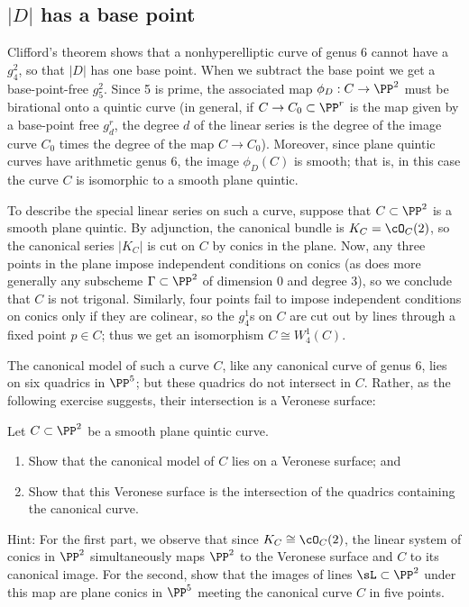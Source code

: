 \subsection{$|D|$ has a base point}\label{g26 has a base point}
Clifford's theorem shows that a nonhyperelliptic curve of genus 6 cannot have a $g^2_4$, so that  
$|D|$ has one base point.
When we subtract the base point we get a base-point-free $g^2_5$. Since 5 is prime, the associated map $\phi_D : C \to \PP^2$ must be birational onto a quintic curve (in general, if $C \to C_0 \subset \PP^r$ is the map given by a base-point free $g^r_d$, the degree $d$ of the linear series is the degree of the image curve $C_0$ times the degree of the map $C \to C_0$). Moreover, since plane quintic curves have arithmetic genus 6, the image $\phi_D(C)$ is smooth; that is, in this case the curve $C$ is isomorphic to a smooth plane quintic.

To describe the special linear series on such a curve, suppose that $C \subset \PP^2$ is a smooth plane quintic. By adjunction, the canonical bundle is $K_C = \cO_C(2)$, so the canonical series $|K_C|$ is cut on $C$ by conics in the plane. Now, any three points in the plane impose independent conditions on conics (as does more generally any subscheme $\Gamma \subset \PP^2$ of dimension 0 and degree 3), so we  conclude that $C$ is not trigonal. Similarly, four points fail to impose independent conditions on conics only if they are colinear, so the $g^1_4$s on $C$ are cut out by lines through a fixed point $p \in C$; thus we get an isomorphism $C \cong W^1_4(C)$.

The canonical model of such a curve $C$, like any canonical curve of genus 6, lies on six quadrics in $\PP^5$; but these quadrics do not intersect in $C$. Rather, as the following exercise suggests, their intersection is a Veronese surface:

\begin{exercise}
Let $C \subset \PP^2$ be a smooth plane quintic curve.
\begin{enumerate}
\item Show that the canonical model of $C$ lies on a Veronese surface; and
\item Show that this Veronese surface is the intersection of the quadrics containing the canonical curve.
\end{enumerate}
\end{exercise}

Hint: For the first part, we observe that since $K_C \cong \cO_C(2)$, the linear system of conics in $\PP^2$ simultaneously maps $\PP^2$ to the Veronese surface and $C$ to its canonical image. For the second, show that the images of lines $\sL  \subset \PP^2$ under this map are plane conics in $\PP^5$ meeting the canonical curve $C$ in five points.

